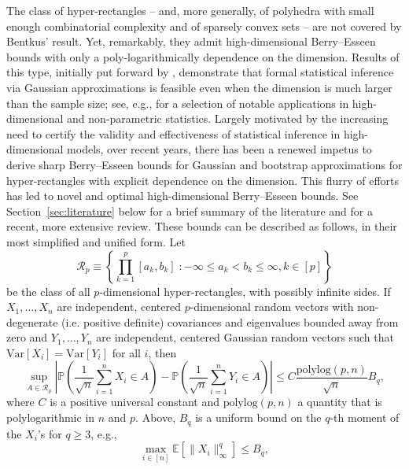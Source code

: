 \documentclass[aos]{imsart}
\begin{document}


The class of hyper-rectangles -- and, more generally, of polyhedra with small enough combinatorial complexity and of sparsely convex sets \citep[see][for details]{chernozhukov2017central} --  are not covered by Bentkus' result. Yet, remarkably, they admit high-dimensional Berry--Esseen bounds  with only a poly-logarithmically dependence on the dimension. 
Results of this type, initially put forward by \cite{chernozhukov2013gaussian}, demonstrate that formal statistical inference via Gaussian approximations is feasible even when the dimension is much larger than the sample size; see, e.g., \cite{belloni2018high} for a selection of notable applications in high-dimensional and non-parametric statistics. Largely motivated by the increasing need to certify the validity and effectiveness of statistical inference in high-dimensional models, over recent years, there has been a renewed impetus to derive sharp Berry--Esseen bounds for Gaussian and bootstrap approximations for hyper-rectangles with explicit dependence on the dimension. This flurry of efforts has led to novel and optimal high-dimensional Berry--Esseen bounds. See Section~\ref{sec:literature} below for a brief summary of the literature and \cite{chernozhukov2023high} for a recent, more extensive review. These bounds can be described as follows, in their most simplified and unified form. Let
\[
\mathcal{R}_p \equiv \left\{  \prod_{k=1}^p [a_k,b_k] \; \colon  -\infty \leq a_k < b_k \leq \infty, k \in [p] \right\}
\]
be the class of all $p$-dimensional hyper-rectangles, with possibly infinite sides. If $X_1,\ldots,X_n$ are independent, centered $p$-dimensional random vectors with non-degenerate (i.e. positive definite) covariances and eigenvalues bounded away from zero and $Y_1,\ldots, Y_n$ are independent, centered Gaussian random vectors such that $\mathrm{Var}[X_i] = \mathrm{Var}[Y_i]$ for all $i$, then 
\begin{equation}\label{eq:uno}
    \sup_{A \in \mathcal{R}_p} \left| \mathbb{P}\left( \frac{1}{\sqrt{n}} \sum_{i=1}^n X_i \in A \right) - \mathbb{P}\left( \frac{1}{\sqrt{n}} \sum_{i=1}^n Y_i \in A\right) \right| \leq C \frac{\mathrm{polylog}(p,n)}{\sqrt{n}} B_{q},
\end{equation}
where $C$ is a positive universal constant and $\mathrm{polylog}(p,n)$ a quantity that is  polylogarithmic in $n$ and $p$.
Above, $B_q$ is a uniform bound on the $q$-th moment of the $X_i$'s for $q \geq 3$, e.g.,
\[
\max_{i \in [n]} \mathbb{E} \left[ \| X_i \|^q_\infty \right] \leq B_q,
\]
\end{document}
